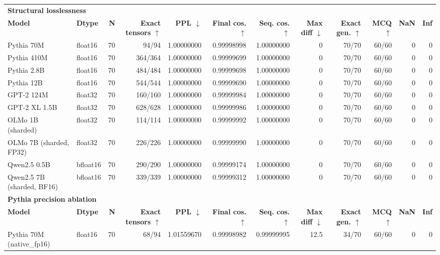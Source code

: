 \begin{table}[t]
\centering
\scriptsize
\begin{tabular}{llrrrrrrrrrr}
\toprule
\multicolumn{12}{l}{\textbf{Structural losslessness}} \\
\textbf{Model} & \textbf{Dtype} & \textbf{N} & \textbf{Exact tensors $\uparrow$} & \textbf{PPL $\downarrow$} & \textbf{Final cos. $\uparrow$} & \textbf{Seq. cos. $\uparrow$} & \textbf{Max diff $\downarrow$} & \textbf{Exact gen. $\uparrow$} & \textbf{MCQ $\uparrow$} & \textbf{NaN} & \textbf{Inf} \\
\midrule
Pythia 70M & float16 & 70 & 94/94 & 1.00000000 & 0.99998998 & 1.00000000 & 0 & 70/70 & 60/60 & 0 & 0 \\
Pythia 410M & float16 & 70 & 364/364 & 1.00000000 & 0.99999699 & 1.00000000 & 0 & 70/70 & 60/60 & 0 & 0 \\
Pythia 2.8B & float16 & 70 & 484/484 & 1.00000000 & 0.99999698 & 1.00000000 & 0 & 70/70 & 60/60 & 0 & 0 \\
Pythia 12B & float16 & 70 & 544/544 & 1.00000000 & 0.99999690 & 1.00000000 & 0 & 70/70 & 60/60 & 0 & 0 \\
GPT-2 124M & float32 & 70 & 160/160 & 1.00000000 & 0.99999984 & 1.00000000 & 0 & 70/70 & 60/60 & 0 & 0 \\
GPT-2 XL 1.5B & float32 & 70 & 628/628 & 1.00000000 & 0.99999986 & 1.00000000 & 0 & 70/70 & 60/60 & 0 & 0 \\
OLMo 1B (sharded) & float32 & 70 & 114/114 & 1.00000000 & 0.99999992 & 1.00000000 & 0 & 70/70 & 60/60 & 0 & 0 \\
OLMo 7B (sharded, FP32) & float32 & 70 & 226/226 & 1.00000000 & 0.99999990 & 1.00000000 & 0 & 70/70 & 60/60 & 0 & 0 \\
Qwen2.5 0.5B & bfloat16 & 70 & 290/290 & 1.00000000 & 0.99999174 & 1.00000000 & 0 & 70/70 & 60/60 & 0 & 0 \\
Qwen2.5 7B (sharded, BF16) & bfloat16 & 70 & 339/339 & 1.00000000 & 0.99999312 & 1.00000000 & 0 & 70/70 & 60/60 & 0 & 0 \\
\midrule
\multicolumn{12}{l}{\textbf{Pythia precision ablation}} \\
\textbf{Model} & \textbf{Dtype} & \textbf{N} & \textbf{Exact tensors $\uparrow$} & \textbf{PPL $\downarrow$} & \textbf{Final cos. $\uparrow$} & \textbf{Seq. cos. $\uparrow$} & \textbf{Max diff $\downarrow$} & \textbf{Exact gen. $\uparrow$} & \textbf{MCQ $\uparrow$} & \textbf{NaN} & \textbf{Inf} \\
\midrule
Pythia 70M (native_fp16) & float16 & 70 & 68/94 & 1.01559670 & 0.99998982 & 0.99999995 & 12.5 & 34/70 & 60/60 & 0 & 0 \\

\end{tabular}
\end{table}
